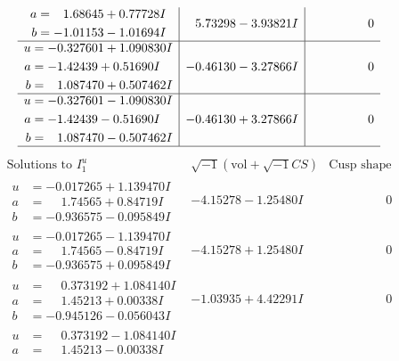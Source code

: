 \documentclass[1p]{elsarticle_modified}
\theoremstyle{definition}
\newcommand{\I}{\sqrt{-1}}
\begin{document}
$$\begin{array}{c|c|c}
\begin{aligned}
a &= \phantom{-}1.68645 + 0.77728 I \\
b &= -1.01153 - 1.01694 I\end{aligned}
 & \phantom{-}5.73298 - 3.93821 I & \phantom{-0.000000 } 0 \\ \hline\begin{aligned}
u &= -0.327601 + 1.090830 I \\
a &= -1.42439 + 0.51690 I \\
b &= \phantom{-}1.087470 + 0.507462 I\end{aligned}
 & -0.46130 - 3.27866 I & \phantom{-0.000000 } 0 \\ \hline\begin{aligned}
u &= -0.327601 - 1.090830 I \\
a &= -1.42439 - 0.51690 I \\
b &= \phantom{-}1.087470 - 0.507462 I\end{aligned}
 & -0.46130 + 3.27866 I & \phantom{-0.000000 } 0\\
 \hline 
 \end{array}$$\newpage$$\begin{array}{c|c|c}  
\text{Solutions to }I^u_{1}& \I (\text{vol} + \sqrt{-1}CS) & \text{Cusp shape}\\
 \hline 
\begin{aligned}
u &= -0.017265 + 1.139470 I \\
a &= \phantom{-}1.74565 + 0.84719 I \\
b &= -0.936575 - 0.095849 I\end{aligned}
 & -4.15278 - 1.25480 I & \phantom{-0.000000 } 0 \\ \hline\begin{aligned}
u &= -0.017265 - 1.139470 I \\
a &= \phantom{-}1.74565 - 0.84719 I \\
b &= -0.936575 + 0.095849 I\end{aligned}
 & -4.15278 + 1.25480 I & \phantom{-0.000000 } 0 \\ \hline\begin{aligned}
u &= \phantom{-}0.373192 + 1.084140 I \\
a &= \phantom{-}1.45213 + 0.00338 I \\
b &= -0.945126 - 0.056043 I\end{aligned}
 & -1.03935 + 4.42291 I & \phantom{-0.000000 } 0 \\ \hline\begin{aligned}
u &= \phantom{-}0.373192 - 1.084140 I \\
a &= \phantom{-}1.45213 - 0.00338 I \\

\end{aligned}
\end{array}$$
\end{document}
